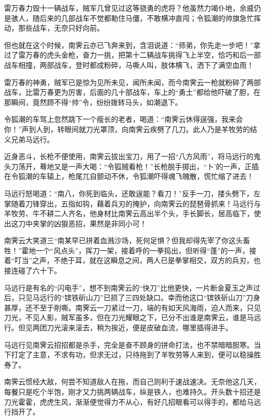 \documentclass[12pt,oneside]{book}
\begin{document}
雷万春力毁十一辆战车，贼军几曾见过这等骁勇的虎将？他虽然力竭仆地，余威仍是骇人，随后来的几部战车不觉都勒住马僵，不敢横冲直闯；令狐潮的帅旗急忙挥动，那些战车，无奈只好向前。

但也就在这个时候，南霁云亦已飞奔来到，含泪说道：``师弟，你先走一步吧！''拿过了雷万春的虎头金枪，奋力一挑，把第十二辆战车挑得飞上半空，恰巧和后一部战车相撞，两部战车，登时都成粉碎，马嘶人叫，肢体横飞，洒下了满空血雨！

雷万春的神勇，贼军已是惊为见所未见，闻所未闻，而今南霁云一枪就粉碎了两部战车，比雷万春更为厉害，后面的几十部战车，车上的``勇土''都给他吓破了胆，在那瞬间，竟然顾不得``帅''令，纷纷拨转马头，如潮退下。

令狐潮的车驾上忽然跳下一个瘦长的老者，喝道：``南霁云休得逞强，我来会你！''声到人到，转眼间就刀光罩顶，向南霁云疾劈了几刀。此人乃是羊牧劳的结义兄弟马远行。

近身恶斗，长枪不便使用，南霁云拔出宝刀，用了一招``八方风雨''，将马远行的鬼头刀荡开，蓦地又是一声大喝：``令狐贼看枪！''长枪脱手掷出，``卜'的一声，正插在令狐潮的车辕上，枪尾兀自颤动不休，令狐潮吓得魂飞魄散，慌忙缩了进去！

马远行怒喝道：``南八，你死到临头，还敢逞能？看刀！''反手一刀，搂头劈下，左掌随着刀锋穿出，五指如钩，藉着兵刃的掩护，向南霁云的琵琶骨抓来！马远行与羊牧劳、牛不耕二人齐名，他身材比南霁云高出半个头，手长脚长，居高临下，使出这刀中夹掌的凶狠恶招，果然是非同小可！

南霁云大笑道三``南某早已拼着血溅沙场，死何足惧？但我却得先宰了你这头畜牲！''霍地一个``风点头''，挥刀一架，接着呼的一拳捣出，但听得``蓬''的一声，接着``叮当''之声，不绝于耳，就在这瞬息之间，两人已是拳掌相交，双方的兵刃，也接连碰了六十下。

马远行是有名的``闪电手''，想不到南霁云的``快刀''比他更快，一片断金夏玉之声过后，只见马远行的``镔铁斫山刀''已损了三四处缺口。幸而他这口``镔铁斫山刀''刀身甚厚，还不至于削嘶。南霁云一刀紧过一刀，端的有如天风海雨，迫人而来，只见刀光，不见人影，贼军虽多，但在刀光耀眼之下，已分不出谁是南霁云，谁是马远行。但见两团刀光滚来滚去，稍为挨近，便是皮破血流，哪里插得进手。

马远行见南霁云招招都是杀手，完全是奋不顾身的拼命打法，也不禁暗暗胆寒。当下打定了主意，不求有功，但求无过，只待拖到了羊牧劳等人来到，便可以稳操胜券了。

南霁云惯经大敌，何尝不知道敌人在拖，而自己则利于速战速决。无奈他这几天，每餐只是吃个半饱，刚才又力挑两辆战车，纵是铁人，也难持久。开头数十招还是刀光霍霍，虎虎生风，渐渐便觉得力不从心，有好几招眼看可以得手的，都给马远行挡开了。
\end{document}
